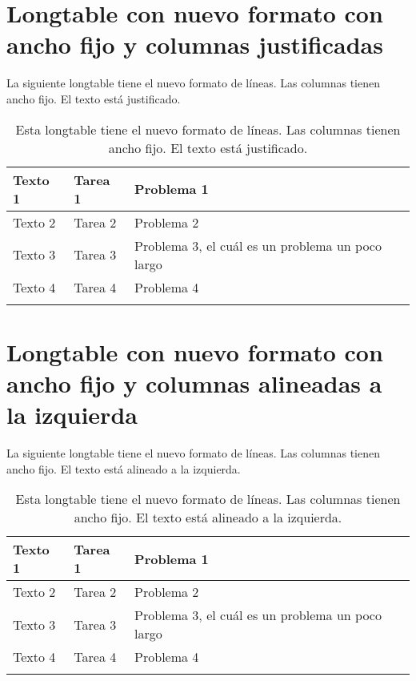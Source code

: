 \section*{Longtable con nuevo formato con ancho fijo y columnas justificadas}

La siguiente longtable tiene el nuevo formato de líneas. Las columnas tienen ancho fijo. El texto está justificado.

\begin{center}
	\begin{longtable}{p{2cm} p{2.5cm} p{5cm}}
		\toprule[2pt]
		\textbf{Texto 1} & \textbf{Tarea 1} & \textbf{Problema 1} \\
		\midrule[1.5pt] \endhead
		Texto 2 & Tarea 2 & Problema 2 \\
		\hline
		Texto 3 & Tarea 3 & Problema 3, el cuál es un problema un poco largo \\
		\hline
		Texto 4 & Tarea 4 & Problema 4 \\
		\bottomrule[2pt]
		\caption[Longtable con nuevo formato con ancho fijo y columnas justificadas]{Esta longtable tiene el nuevo formato de líneas. Las columnas tienen ancho fijo. El texto está justificado.}
		\label{table13}
	\end{longtable}
\end{center}

\section*{Longtable con nuevo formato con ancho fijo y columnas alineadas a la izquierda}

La siguiente longtable tiene el nuevo formato de líneas. Las columnas tienen ancho fijo. El texto está alineado a la izquierda.

\begin{center}
	\begin{longtable}{>{\raggedright\arraybackslash}p{2cm} >{\raggedright\arraybackslash}p{2.5cm} >{\raggedright\arraybackslash}p{5cm}}
		\toprule[2pt]
		\textbf{Texto 1} & \textbf{Tarea 1} & \textbf{Problema 1} \\
		\midrule[1.5pt] \endhead
		Texto 2 & Tarea 2 & Problema 2 \\
		\hline
		Texto 3 & Tarea 3 & Problema 3, el cuál es un problema un poco largo \\
		\hline
		Texto 4 & Tarea 4 & Problema 4 \\
		\bottomrule[2pt]
		\caption[Longtable con formato con ancho fijo y columnas alineadas a la izquierda]{Esta longtable tiene el nuevo formato de líneas. Las columnas tienen ancho fijo. El texto está alineado a la izquierda.}
		\label{table14}
	\end{longtable}
\end{center}

